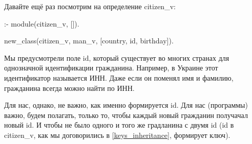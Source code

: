 \documentclass[a4paper]{book}
\begin{document}
Давайте ещё раз посмотрим на определение citizen_v:

\begin{example}{}{}
:- module(citizen_v, []).

new_class(citizen_v, man_v, [country, id, birthday]).
\end{example}

Мы предусмотрели поле id, который существует во многих странах
для однозначной идентификации гражданина. Например, в Украине
этот идентификатор называется ИНН. Даже если он поменял имя и
фамилию, гражданина всегда можно найти по ИНН.

Для нас, однако, не важно, как именно формируется id. Для нас
(программы) важно, будем полагать, только то, чтобы каждый новый
гражданин получачал новый id. И чтобы не было одного и того же
градланина с двумя id (id в citizen_v, как мы договорились в
\ref{keys_inheritance}, формирует ключ).
\end{document}
